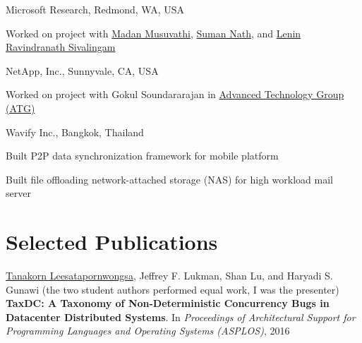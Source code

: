 \documentclass[10pt]{article} %
\begin{document}
{Microsoft Research, Redmond, WA, USA}
{\begin{minipage}{\smallertextwidth}
Worked on  project
with \href{https://www.microsoft.com/en-us/research/people/madanm/}{Madan Musuvathi}, 
\href{https://www.microsoft.com/en-us/research/people/sumann/}{Suman Nath}, 
and \href{http://people.csail.mit.edu/lenin/}{Lenin Ravindranath Sivalingam}
\end{minipage}} 


{NetApp, Inc., Sunnyvale, CA, USA}
{\begin{minipage}{\smallertextwidth}
Worked on  project
with Gokul Soundararajan
in \href{http://www.netapp.com/us/company/leadership/advanced-technology/}{Advanced Technology Group (ATG)} 
\end{minipage}}


{Wavify Inc., Bangkok, Thailand}
{\begin{minipage}{\smallertextwidth}
\begin{itemize-noindent}
\setlength\itemsep{-1ex}
\item Built P2P data synchronization framework for mobile platform
\item Built file offloading network-attached storage (NAS) for high workload mail server
\end{itemize-noindent}
\end{minipage}}


\section{Selected Publications}
\underline{Tanakorn Leesatapornwongsa}, Jeffrey F. Lukman, Shan Lu, and Haryadi
S. Gunawi (the two student authors performed equal work, I was the presenter)
\textbf{TaxDC: A Taxonomy of Non-Deterministic Concurrency Bugs in Datacenter
Distributed Systems}. In \textit{Proceedings of Architectural Support for
Programming Languages and Operating Systems (ASPLOS)}, 2016 
\vspace{2mm}
\end{document}
